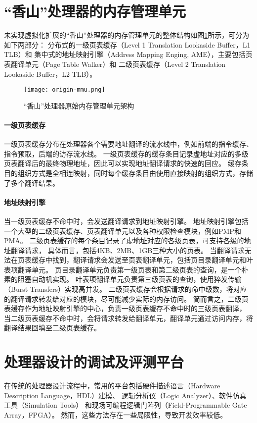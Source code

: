 \section{“香山”处理器的内存管理单元}
未实现虚拟化扩展的“香山”处理器的内存管理单元的整体结构如图\ref{fig:origin-mmu}所示，可分为如下两部分：
分布式的一级页表缓存（Level 1 Translation Lookaside Buffer，L1 TLB）和
集中式的地址映射引擎（Address Mapping Enging, AME），主要包括页表翻译单元（Page Table Walker）和
二级页表缓存（Level 2 Translation Lookaside Buffer，L2 TLB）。

\begin{figure}[htbp]
    \centering
    \texttt{[image: origin-mmu.png]}
    \caption{“香山”处理器原始内存管理单元架构}
    \label{fig:origin-mmu}
\end{figure}

\paragraph{一级页表缓存} 
一级页表缓存分布在处理器各个需要地址翻译的流水线中，例如前端的指令缓存、指令预取，后端的访存流水线。
一级页表缓存的缓存条目记录虚地址对应的多级页表翻译后的最终物理地址，因此可以实现地址翻译请求的快速的回应。
缓存条目的组织方式是全相连映射，同时每个缓存条目由使用直接映射的组织方式，存储了多个翻译结果。

\paragraph{地址映射引擎} 
当一级页表缓存不命中时，会发送翻译请求到地址映射引擎。
地址映射引擎包括一个大型的二级页表缓存、页表翻译单元以及各种权限检查模块，例如PMP和PMA。
二级页表缓存的每个条目记录了虚地址对应的各级页表，可支持各级的地址翻译请求，
具体而言，包括4KB、2MB、1GB三种大小的页表。
当翻译请求无法在页表缓存中找到，翻译请求会发送至页表翻译单元，包括页目录翻译单元和叶表项翻译单元。
页目录翻译单元负责第一级页表和第二级页表的查询，是一个朴素的阻塞自动机实现。
叶表项翻译单元负责第三级页表的查询，使用猝发传输（Burst Transfers）实现高并发。
二级页表缓存会根据请求的命中级数，将对应的翻译请求转发给对应的模块，尽可能减少实际的内存访问。
简而言之，二级页表缓存作为地址映射引擎的中心，负责一级页表缓存不命中时的三级页表翻译，
当二级页表缓存不命中时，会将请求转发给翻译单元，翻译单元通过访问内存，将翻译结果回填至二级页表缓存。

\section{处理器设计的调试及评测平台}
在传统的处理器设计流程中，常用的平台包括硬件描述语言（Hardware Description Language，HDL）建模、
逻辑分析仪（Logic Analyzer）、软件仿真工具（Simulation Tools）
和现场可编程逻辑门阵列（Field-Programmable Gate Array，FPGA）。
然而，这些方法存在一些局限性，导致开发效率较低。

